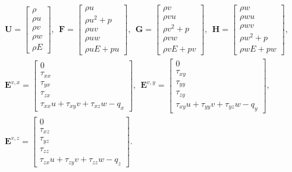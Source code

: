 \begin{equation}
    \begin{array}{l}
        \mathbf{U} = \left[\begin{array}{c}\rho \\ \rho u \\ \rho v \\ \rho w \\ \rho E\end{array}\right], ~~
        \mathbf{F} = \left[\begin{array}{c}\rho u \\ \rho u^2 + p \\ \rho u v \\ \rho u w \\ \rho u E + p u\end{array}\right], ~~
        \mathbf{G} = \left[\begin{array}{c}\rho v \\ \rho v u \\ \rho v^2 + p \\ \rho v w \\ \rho v E + p v\end{array}\right], ~~
        \mathbf{H} = \left[\begin{array}{c}\rho w \\ \rho w u \\ \rho w v \\ \rho w^2 + p \\ \rho w E + p w\end{array}\right], \\[4em]
        \mathbf{E}^{v,x} = \left[\begin{array}{c}0 \\ \tau_{xx} \\ \tau_{yx} \\ \tau_{zx} \\ \tau_{xx} u + \tau_{xy} v +\tau_{xz} w - q_x\end{array}\right], ~~
        \mathbf{E}^{v,y} = \left[\begin{array}{c}0 \\ \tau_{xy} \\ \tau_{yy} \\ \tau_{zy} \\ \tau_{xy} u + \tau_{yy} v + \tau_{yz} w - q_y\end{array}\right], \\[4em]
        \mathbf{E}^{v,z} = \left[\begin{array}{c}0 \\ \tau_{xz} \\ \tau_{yz} \\ \tau_{zz} \\ \tau_{zx} u + \tau_{zy} v + \tau_{zz} w - q_z\end{array}\right].
    \end{array}
    \label{eq:cons_ns_vectors}
\end{equation}

